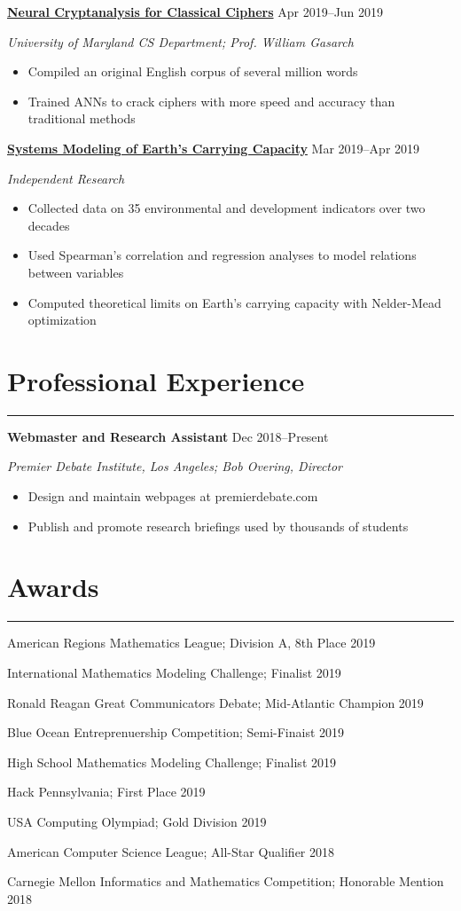\documentclass[11pt]{article}
\newcommand{\resumesection}[1]{\vspace{-0.3cm}\section*{\color{highlight}#1}\vspace{-0.3cm}\hrule\vspace{0.3cm}}
\begin{document}
\textbf{\href{https://github.com/petezh/Neural-Cryptanalysis}{Neural Cryptanalysis for Classical Ciphers}} \hfill Apr 2019--Jun 2019\par
\textit{University of Maryland CS Department; Prof. William Gasarch}
\begin{itemize}
	\item Compiled an original English corpus of several million words
	\item Trained ANNs to crack ciphers with more speed and accuracy than traditional methods
\end{itemize}\vspace{0.1cm}

\textbf{\href{https://github.com/gautomdas/IMMC-World4}{Systems Modeling of Earth's Carrying Capacity}} \hfill Mar 2019--Apr 2019\par
\textit{Independent Research}
\begin{itemize}
	\item Collected data on 35 environmental and development indicators over two decades
	\item Used Spearman's correlation and regression analyses to model relations between variables
	\item Computed theoretical limits on Earth's carrying capacity with Nelder-Mead optimization
\end{itemize}



\resumesection{Professional Experience}

\textbf{Webmaster and Research Assistant}   \hfill Dec 2018--Present \par
\textit{Premier Debate Institute, Los Angeles; Bob Overing, Director}
\begin{itemize}
	\item Design and maintain webpages at premierdebate.com
	\item Publish and promote research briefings used by thousands of students
\end{itemize}

\resumesection{Awards}

American Regions Mathematics League; Division A, 8th Place \hfill 2019 \par
International Mathematics Modeling Challenge; Finalist \hfill 2019\par
Ronald Reagan Great Communicators Debate; Mid-Atlantic Champion \hfill 2019 \par
Blue Ocean Entreprenuership Competition; Semi-Finaist \hfill 2019 \par
High School Mathematics Modeling Challenge; Finalist \hfill 2019\par
Hack Pennsylvania; First Place \hfill 2019\par
USA Computing Olympiad; Gold Division \hfill 2019\par
American Computer Science League; All-Star Qualifier \hfill 2018 \par 
Carnegie Mellon Informatics and Mathematics Competition; Honorable Mention \hfill 2018\par
\end{document}
